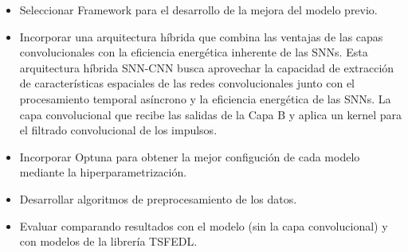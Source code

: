 \begin{itemize}
    \item Seleccionar Framework para el desarrollo de la mejora del modelo previo.
    \item Incorporar una arquitectura híbrida que combina las ventajas de las capas convolucionales con la eficiencia energética inherente de las SNNs. Esta arquitectura híbrida SNN-CNN busca aprovechar la capacidad de extracción de características espaciales de las redes convolucionales junto con el procesamiento temporal asíncrono y la eficiencia energética de las SNNs. La capa convolucional que recibe las salidas de la Capa B y aplica un kernel para el filtrado convolucional de los impulsos.
    \item Incorporar Optuna para obtener la mejor configución de cada modelo mediante la hiperparametrización.
    \item Desarrollar algoritmos de preprocesamiento de los datos.
    \item Evaluar comparando resultados con el modelo (sin la capa convolucional) y con modelos de la librería TSFEDL.

\end{itemize}


